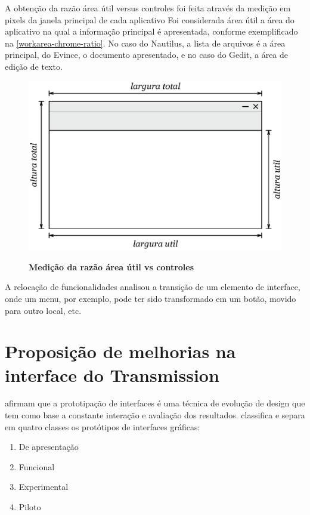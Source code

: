 A obtenção da razão área útil versus controles foi feita através da medição em
pixels da janela principal de cada aplicativo Foi considerada área útil a área
do aplicativo na qual a informação principal é apresentada, conforme
exemplificado na \autoref{workarea-chrome-ratio}. No caso do Nautilus, a lista
de arquivos é a área principal, do Evince, o documento apresentado, e no caso do
Gedit, a área de edição de texto.

\begin{figure}[h!]
  \begin{center}
    \caption{\textbf{Medição da razão área útil vs controles}}
    \includegraphics[scale=0.7]{image/workarea-chrome-ratio.eps}
    \label{workarea-chrome-ratio}
  \end{center}
\end{figure}

A relocação de funcionalidades analisou a transição de um elemento de interface,
onde um menu, por exemplo, pode ter sido transformado em um botão, movido para
outro local, etc.

\section{Proposição de melhorias na interface do Transmission}

 afirmam que a prototipação de interfaces é uma técnica
de evolução de design que tem como base a constante interação e avaliação dos
resultados.  classifica e separa em quatro
classes os protótipos de interfaces gráficas:

\begin{enumerate}
  \item De apresentação
  \item Funcional
  \item Experimental
  \item Piloto
\end{enumerate}

